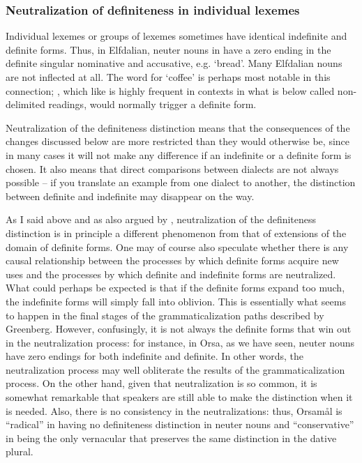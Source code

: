 \subsubsection{Neutralization of definiteness in individual lexemes}
Individual lexemes or groups of lexemes sometimes have identical indefinite and definite forms. Thus, in Elfdalian, neuter nouns in have a zero ending in the definite singular nominative and accusative, e.g.  ‘bread’. Many Elfdalian nouns are not inflected at all.  The word for ‘coffee’ is perhaps most notable in this connection; , which like  is highly frequent in contexts in what is below called non-delimited readings, would normally trigger a definite form. 

Neutralization of the definiteness distinction means that the consequences of the changes discussed below are more restricted than they would otherwise be, since in many cases it will not make any difference if an indefinite or a definite form is chosen. It also means that direct comparisons between dialects are not always possible – if you translate an example from one dialect to another, the distinction between definite and indefinite may disappear on the way. 

As I said above and as also argued by \citet{Hummelstedt1934}, neutralization of the definiteness distinction is in principle a different phenomenon from that of extensions of the domain of definite forms. One may of course also speculate whether there is any causal relationship between the processes by which definite forms acquire new uses and the processes by which definite and indefinite forms are neutralized. What could perhaps be expected is that if the definite forms expand too much, the indefinite forms will simply fall into oblivion. This is essentially what seems to happen in the final stages of the grammaticalization paths described by Greenberg. However, confusingly, it is not always the definite forms that win out in the neutralization process: for instance, in Orsa, as we have seen, neuter nouns have zero endings for both indefinite and definite. In other words, the neutralization process may well obliterate the results of the grammaticalization process. On the other hand, given that neutralization is so common, it is somewhat remarkable that speakers are still able to make the distinction when it is needed. Also, there is no consistency in the neutralizations: thus, Orsamål is “radical” in having no definiteness distinction in neuter nouns and “conservative” in being the only vernacular that preserves the same distinction in the dative plural.

